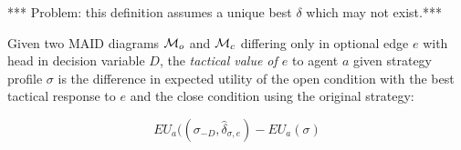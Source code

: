 \documentclass[../thesis.tex]{subfiles}
\begin{document}
*** Problem: this definition assumes a unique best $\delta$
which may not exist.***

\begin{dfn}
  \label{def:tactical-value}
  Given two MAID diagrams $\mathcal{M}_{o}$ and $\mathcal{M}_{c}$
  differing only in optional edge $e$ with head in decision
  variable $D$,
  the \emph{tactical value of $e$} to agent $a$ given
  strategy profile $\sigma$
  is the difference in expected utility of
  the open condition with the best tactical response to $e$
  and the close condition using the original strategy:

  $$EU_a((\sigma_{-D},\hat{\delta}_{\sigma,e}) - EU_a(\sigma)$$
\end{dfn}

 
\end{document}
